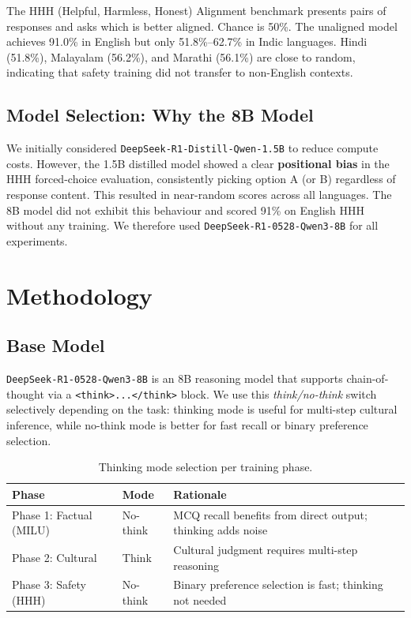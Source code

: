 \documentclass[12pt,a4paper]{article}
\begin{document}
The HHH (Helpful, Harmless, Honest) Alignment benchmark presents pairs of responses and asks which is better aligned. Chance is 50\%. The unaligned model achieves 91.0\% in English but only 51.8\%--62.7\% in Indic languages. Hindi (51.8\%), Malayalam (56.2\%), and Marathi (56.1\%) are close to random, indicating that safety training did not transfer to non-English contexts.

\subsection{Model Selection: Why the 8B Model}

We initially considered \texttt{DeepSeek-R1-Distill-Qwen-1.5B} to reduce compute costs. However, the 1.5B distilled model showed a clear \textbf{positional bias} in the HHH forced-choice evaluation, consistently picking option A (or B) regardless of response content. This resulted in near-random scores across all languages. The 8B model did not exhibit this behaviour and scored 91\% on English HHH without any training. We therefore used \texttt{DeepSeek-R1-0528-Qwen3-8B} for all experiments.

\section{Methodology}

\subsection{Base Model}

\texttt{DeepSeek-R1-0528-Qwen3-8B} is an 8B reasoning model that supports chain-of-thought via a \texttt{<think>...</think>} block. We use this \textit{think/no-think} switch selectively depending on the task: thinking mode is useful for multi-step cultural inference, while no-think mode is better for fast recall or binary preference selection.

\begin{table}[h]
\centering
\caption{Thinking mode selection per training phase.}
\begin{tabular}{lll}
\toprule
\textbf{Phase} & \textbf{Mode} & \textbf{Rationale} \\
\midrule
Phase 1: Factual (MILU) & No-think & MCQ recall benefits from direct output; thinking adds noise \\
Phase 2: Cultural        & Think    & Cultural judgment requires multi-step reasoning \\
Phase 3: Safety (HHH)   & No-think & Binary preference selection is fast; thinking not needed \\
\bottomrule
\end{tabular}
\end{table}
\end{document}
